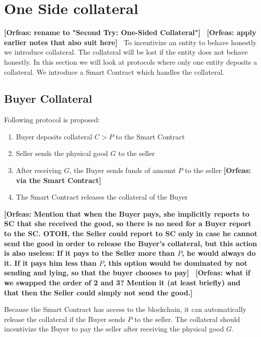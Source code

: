 \documentclass{cacthesis}
\newcommand{\authnote}[3]{{ \footnotesize \textbf{#1[#2: #3]~}}}
\newcommand{\orfnote}[1]{\authnote{\color{blue}}{Orfeas}{#1}}
\begin{document}
\section{One Side collateral} \orfnote{rename to "Second Try: One-Sided
Collateral"} \orfnote{apply earlier notes that also suit here}
To incentivize an entity to behave honestly we introduce collateral. The collateral will be lost if the entity does not behave honestly. In this section we will look at protocols where only one entity deposits a collateral. We introduce a Smart Contract which handles the collateral.

\subsection{Buyer Collateral}
Following protocol is proposed:
\begin{enumerate}
    \item Buyer deposits collateral $C > P$ to the Smart Contract
    \item Seller sends the physical good $G$ to the seller
    \item After receiving $G$, the Buyer sends funds of amount $P$ to the seller
    \orfnote{via the Smart Contract}
    \item The Smart Contract releases the collateral of the Buyer
\end{enumerate} \orfnote{Mention that when the Buyer pays, she implicitly
reports to SC that she received the good, so there is no need for a Buyer report
to the SC. OTOH, the Seller could report to SC only in case he cannot send the
good in order to release the Buyer's collateral, but this action is also
useless: If it pays to the Seller more than $P$, he would always do it. If it
pays him less than $P$, this option would be dominated by not sending and lying,
so that the buyer chooses to pay} \orfnote{what if we swapped the order of 2 and
3? Mention it (at least briefly) and that then the Seller could simply not send
the good.}

Because the Smart Contract has access to the blockchain, it can automatically release the collateral if the Buyer sends $P$  to the seller. The collateral should incentivize the Buyer to pay the seller after receiving the physical good $G$.
\end{document}
